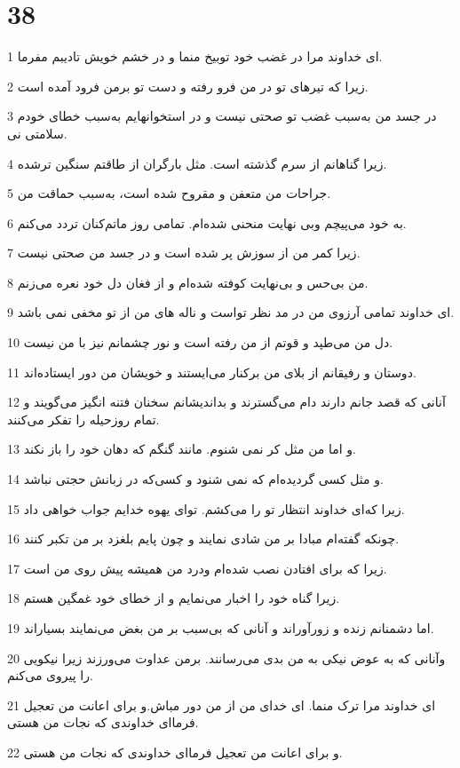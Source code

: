 \chapter{38}

\par 1 ای خداوند مرا در غضب خود توبیخ منما و در خشم خویش تادیبم مفرما.
\par 2 زیرا که تیرهای تو در من فرو رفته و دست تو برمن فرود آمده است.
\par 3 در جسد من به‌سبب غضب تو صحتی نیست و در استخوانهایم به‌سبب خطای خودم سلامتی نی.
\par 4 زیرا گناهانم از سرم گذشته است. مثل بارگران از طاقتم سنگین ترشده.
\par 5 جراحات من متعفن و مقروح شده است، به‌سبب حماقت من.
\par 6 به خود می‌پیچم وبی نهایت منحنی شده‌ام. تمامی روز ماتم‌کنان تردد می‌کنم.
\par 7 زیرا کمر من از سوزش پر شده است و در جسد من صحتی نیست.
\par 8 من بی‌حس و بی‌نهایت کوفته شده‌ام و از فغان دل خود نعره می‌زنم.
\par 9 ‌ای خداوند تمامی آرزوی من در مد نظر تواست و ناله های من از تو مخفی نمی باشد.
\par 10 دل من می‌طپد و قوتم از من رفته است و نور چشمانم نیز با من نیست.
\par 11 دوستان و رفیقانم از بلای من برکنار می‌ایستند و خویشان من دور ایستاده‌اند.
\par 12 آنانی که قصد جانم دارند دام می‌گسترند و بداندیشانم سخنان فتنه انگیز می‌گویند و تمام روزحیله را تفکر می‌کنند.
\par 13 و اما من مثل کر نمی شنوم. مانند گنگم که دهان خود را باز نکند.
\par 14 و مثل کسی گردیده‌ام که نمی شنود و کسی‌که در زبانش حجتی نباشد.
\par 15 زیرا که‌ای خداوند انتظار تو را می‌کشم. تو‌ای یهوه خدایم جواب خواهی داد.
\par 16 چونکه گفته‌ام مبادا بر من شادی نمایند و چون پایم بلغزد بر من تکبر کنند.
\par 17 زیرا که برای افتادن نصب شده‌ام ودرد من همیشه پیش روی من است.
\par 18 زیرا گناه خود را اخبار می‌نمایم و از خطای خود غمگین هستم.
\par 19 اما دشمنانم زنده و زورآوراند و آنانی که بی‌سبب بر من بغض می‌نمایند بسیاراند.
\par 20 وآنانی که به عوض نیکی به من بدی می‌رسانند. برمن عداوت می‌ورزند زیرا نیکویی را پیروی می‌کنم.
\par 21 ‌ای خداوند مرا ترک منما. ای خدای من از من دور مباش.و برای اعانت من تعجیل فرما‌ای خداوندی که نجات من هستی.
\par 22 و برای اعانت من تعجیل فرما‌ای خداوندی که نجات من هستی.
 
